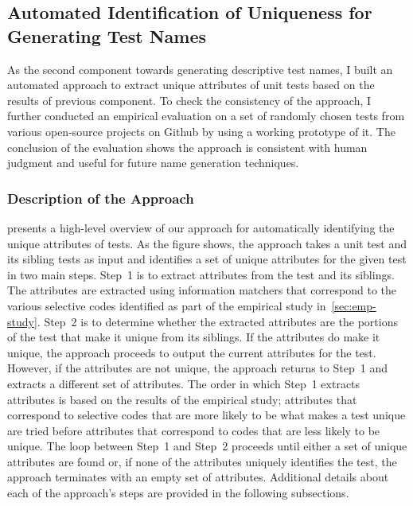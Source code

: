 \subsection{Automated Identification of Uniqueness for Generating Test Names}
\label{sec:uniquness-approach}

As the second component towards generating descriptive test names, I built an automated approach to extract unique attributes of unit tests based on the results of previous component.
%
To check the consistency of the approach, I further conducted an empirical evaluation on a set of randomly chosen tests from various open-source projects on Github by using a working prototype of it.
%
The conclusion of the evaluation shows the approach is consistent with human judgment and useful for future name generation techniques.


\subsubsection{Description of the Approach}

 presents a high-level overview of our approach for automatically identifying the unique attributes of tests.
%
As the figure shows, the approach takes a unit test and its sibling tests as input and identifies a set of unique attributes for the given test in two main steps.
%
Step~1 is to extract attributes from the test and its siblings.
%
The attributes are extracted using information matchers that correspond to the various selective codes identified as part of the empirical study in~\cref{sec:emp-study}.
%
Step~2 is to determine whether the extracted attributes are the portions of the test that make it unique from its siblings.
%
If the attributes do make it unique, the approach proceeds to output the current attributes for the test.
%
However, if the attributes are not unique, the approach returns to Step~1 and extracts a different set of attributes.
%
The order in which Step~1 extracts attributes is based on the results of the empirical study; attributes that correspond to selective codes that are more likely to be what makes a test unique are tried before attributes that correspond to codes that are less likely to be unique.
% 
The loop between Step~1 and Step~2 proceeds until either a set of unique attributes are found or, if none of the attributes uniquely identifies the test, the approach terminates with an empty set of attributes.
%
Additional details about each of the approach's steps are provided in the following subsections.


